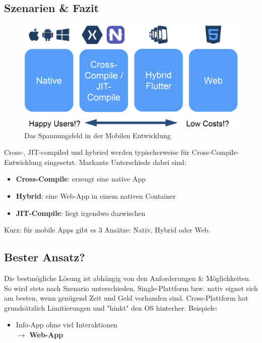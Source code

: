 \documentclass[a4paper]{article}
\begin{document}
{	\subsection{Szenarien \& Fazit}
	
	\begin{figure}[!htb]
		\centering
		\includegraphics[width=.6\textwidth]{img/android8/spannungsfeld.png}
		\caption{Das Spannungsfeld in der Mobilen Entwicklung}
		\label{fig:spannungsfeld}
	\end{figure}
	\noindent
	Cross-, JIT-compiled und hybried werden typischerweise für Cross-Compile-Entwicklung eingesetzt.
	Markante Unterschiede dabei sind:
	\begin{itemize}
		
		\item \textbf{Cross-Compile}: erzeugt eine native App
		
		\item \textbf{Hybrid}: eine Web-App in einem nativen Container
		
		\item \textbf{JIT-Compile}: liegt irgendwo dazwischen
		
	\end{itemize}

	Kurz: für mobile Apps gibt es 3 Ansätze: Nativ, Hybrid oder Web.
	
	\newpage
	
	\subsection{Bester Ansatz?}
	
	Die bestmögliche Lösung ist abhängig von den Anforderungen \& Möglichkeiten.
	So wird stets nach Szenario unterschieden.
	Single-Plattform bzw. nativ eignet sich am besten, wenn genügend Zeit und Geld vorhanden sind.
	Cross-Plattform hat grundsätzlich Limitierungen und "hinkt" den OS hinterher.
	Beispiele:
	\begin{itemize}
		
		\item Info-App ohne viel Interaktionen \\
		$\rightarrow$ \textbf{Web-App}
		

\end{itemize}}
\end{document}
